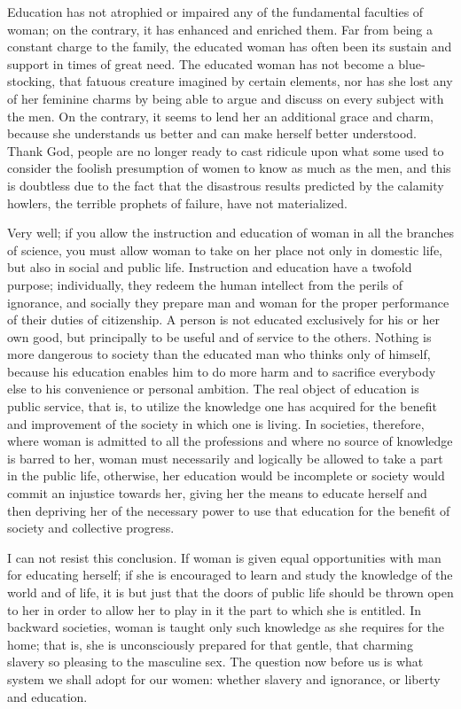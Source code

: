 \begin{linenumbers*}
\indent Education has not atrophied or impaired any of the fundamental faculties of woman; on the contrary, it has enhanced and enriched them. Far from being a constant charge to the family, the educated woman has often been its sustain and support in times of great need. The educated woman has not become a blue-stocking, that fatuous creature imagined by certain elements, nor has she lost any of her feminine charms by being able to argue and discuss on every subject with the men. On the contrary, it seems to lend her an additional grace and charm, because she understands us better and can make herself better understood. Thank God, people are no longer ready to cast ridicule upon what some used to consider the foolish presumption of women to know as much as the men, and this is doubtless due to the fact that the disastrous results predicted by the calamity howlers, the terrible prophets of failure, have not materialized.

\indent Very well; if you allow the instruction and education of woman in all the branches of science, you must allow woman to take on her place not only in domestic life, but also in social and public life. Instruction and education have a twofold purpose; individually, they redeem the human intellect from the perils of ignorance, and socially they prepare man and woman for the proper performance of their duties of citizenship. A person is not educated exclusively for his or her own good, but principally to be useful and of service to the others. Nothing is more dangerous to society than the educated man who thinks only of himself, because his education enables him to do more harm and to sacrifice everybody else to his convenience or personal ambition. The real object of education is public service, that is, to utilize the knowledge one has acquired for the benefit and improvement of the society in which one is living.
In societies, therefore, where woman is admitted to all the professions and where no source of knowledge is barred to her, woman must necessarily and logically be allowed to take a part in the public life, otherwise, her education would be incomplete or society would commit an injustice towards her, giving her the means to educate herself and then depriving her of the necessary power to use that education for the benefit of society and collective progress.

\indent I can not resist this conclusion. If woman is given equal opportunities with man for educating herself; if she is encouraged to learn and study the knowledge of the world and of life, it is but just that the doors of public life should be thrown open to her in order to allow her to play in it the part to which she is entitled. In backward societies, woman is taught only such knowledge as she requires for the home; that is, she is unconsciously prepared for that gentle, that charming slavery so pleasing to the masculine sex. The question now before us is what system we shall adopt for our women: whether slavery and ignorance, or liberty and education.


\end{linenumbers*}
